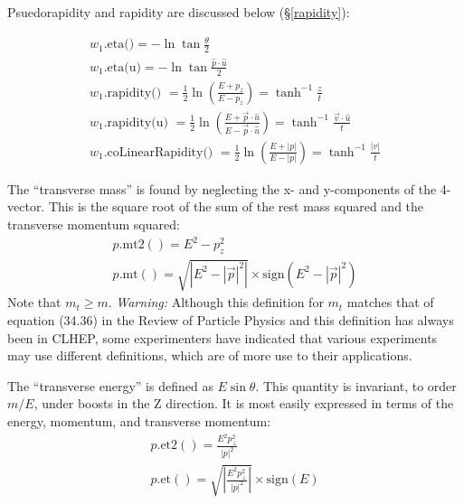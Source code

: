 Psuedorapidity and rapidity are discussed below (\S\ref{rapidity}):

\begin{eqnarray}
\label{eq:weta}
  w_1\mbox{.eta()} = - \ln \tan \frac{\theta}{2} \\
\label{eq:weta:2}
  w_1\mbox{.eta(u)} = - \ln \tan \frac{\hat{p} \cdot \hat{u}}{2} \\
\label{eq:wrapid}
  w_1\mbox{.rapidity() }
	= \frac{1}{2} \ln \left( \frac{E + p_z}{E - p_z}    \right)
	= \tanh^{-1} \frac {z}{t} \\
\label{eq:wrapid:2}
  w_1\mbox{.rapidity(u) }
	= \frac{1}{2} \ln \left( \frac{E + \vec{p} \cdot \hat{u}}
				      {E - \vec{p} \cdot \hat{u}} \right)
	= \tanh^{-1} \frac {\vec{v} \cdot \hat{u}} {t} \\
\label{eq:wcoLinRap}
  w_1\mbox{.coLinearRapidity() }
	= \frac{1}{2} \ln \left( \frac{E + |p|}{E - |p|}    \right)
	= \tanh^{-1} \frac {|v|}{t}
\end{eqnarray}

\noindent
The ``transverse mass'' is found by neglecting the x- and
y-components of the 4-vector.  This is the square root of the 
sum of the rest mass squared and the transverse momentum squared:
\begin{eqnarray}
\label{eq:wmt2}
  p\mbox{.mt2}() = E^2 - p_z^2 \\
\label{eq:wmt}
  p\mbox{.mt}() = \sqrt { \left| E^2 - |\vec{p}|^2 \right| } 
			\times \mbox{sign}(E^2 - |\vec{p}|^2) 
\end{eqnarray}
\noindent  
Note that $m_t \ge m$.  {\it Warning:} Although this definition for $m_t$
matches that of equation (34.36) in the Review of Particle Physics and this
definition has always been in CLHEP, some experimenters have indicated that 
various experiments may use different definitions, which are of more use to
their applications.  

\noindent
The ``transverse energy'' is defined as $E \sin \theta$.
This quantity is invariant, to order $m/E$, under boosts in the Z direction.
It is most easily expressed in terms of the energy, momentum, and 
transverse momentum:
\begin{eqnarray}
\label{eq:wet2}
  p\mbox{.et2}() = \frac {E^2 p_\perp^2}{|p|^2} \\
\label{eq:wet}
  p\mbox{.et}() = \sqrt { \left| \frac {E^2 p_\perp^2}{|p|^2} \right| } 
			\times \mbox{sign}(E)
\end{eqnarray}

